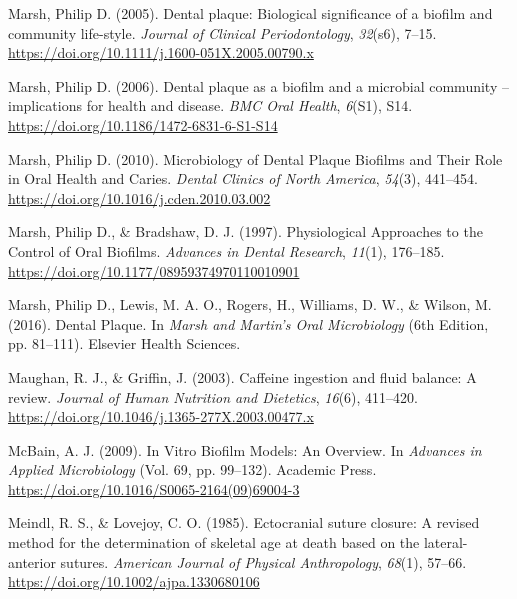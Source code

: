 \documentclass[
  letterpaper,
]{book}
\newlength{\cslhangindent}
\newlength{\cslentryspacingunit} %
\newenvironment{CSLReferences}[2] %
 {%
  \setlength{\parindent}{0pt}
  \ifodd #1
  \let\oldpar\par
  \def\par{\hangindent=\cslhangindent\oldpar}
  \fi
  \setlength{\parskip}{#2\cslentryspacingunit}
 }%
 {}
\begin{document}
\begin{CSLReferences}{1}{0}
\leavevmode{}%
Marsh, Philip D. (2005). Dental plaque: Biological significance of a
biofilm and community life-style. \emph{Journal of Clinical
Periodontology}, \emph{32}(s6), 7--15.
\url{https://doi.org/10.1111/j.1600-051X.2005.00790.x}

\leavevmode{}%
Marsh, Philip D. (2006). Dental plaque as a biofilm and a microbial
community -- implications for health and disease. \emph{BMC Oral
Health}, \emph{6}(S1), S14.
\url{https://doi.org/10.1186/1472-6831-6-S1-S14}

\leavevmode{}%
Marsh, Philip D. (2010). Microbiology of {Dental Plaque Biofilms} and
{Their Role} in {Oral Health} and {Caries}. \emph{Dental Clinics of
North America}, \emph{54}(3), 441--454.
\url{https://doi.org/10.1016/j.cden.2010.03.002}

\leavevmode{}%
Marsh, Philip D., \& Bradshaw, D. J. (1997). Physiological {Approaches}
to the {Control} of {Oral Biofilms}. \emph{Advances in Dental Research},
\emph{11}(1), 176--185.
\url{https://doi.org/10.1177/08959374970110010901}

\leavevmode{}%
Marsh, Philip D., Lewis, M. A. O., Rogers, H., Williams, D. W., \&
Wilson, M. (2016). Dental {Plaque}. In \emph{Marsh and {Martin}'s {Oral
Microbiology}} (6th Edition, pp. 81--111). {Elsevier Health Sciences}.

\leavevmode{}%
Maughan, R. J., \& Griffin, J. (2003). Caffeine ingestion and fluid
balance: A review. \emph{Journal of Human Nutrition and Dietetics},
\emph{16}(6), 411--420.
\url{https://doi.org/10.1046/j.1365-277X.2003.00477.x}

\leavevmode{}%
McBain, A. J. (2009). In {Vitro Biofilm Models}: {An Overview}. In
\emph{Advances in {Applied Microbiology}} (Vol. 69, pp. 99--132).
{Academic Press}. \url{https://doi.org/10.1016/S0065-2164(09)69004-3}

\leavevmode{}%
Meindl, R. S., \& Lovejoy, C. O. (1985). Ectocranial suture closure: {A}
revised method for the determination of skeletal age at death based on
the lateral-anterior sutures. \emph{American Journal of Physical
Anthropology}, \emph{68}(1), 57--66.
\url{https://doi.org/10.1002/ajpa.1330680106}


\end{CSLReferences}
\end{document}

